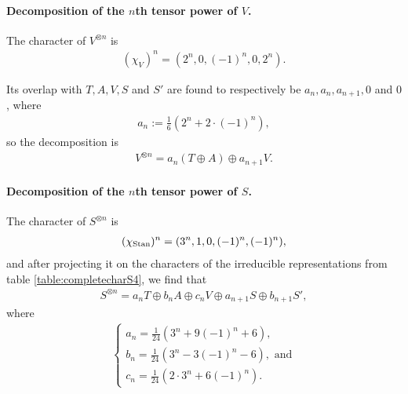 \begin{example}
	
	\paragraph{Decomposition of the $n$th tensor power of $V$.}	The character of $V^{\otimes n}$ is
	\begin{align*}
		(\chi_{V})^n = (2^n, 0, (-1)^n, 0, 2^n).
	\end{align*}
	
	Its overlap with $T, A, V, S$ and $S'$ are found to respectively be $a_n, a_n, a_{n+1}, 0$ and $0$, where 
	\begin{align*}
		a_n := \frac{1}{6}\left( 2^n + 2 \cdot (-1)^n \right),
	\end{align*}
	so the decomposition is
	\begin{align*}
		V^{\otimes n} = a_n (T \oplus A) \oplus a_{n+1} V.
	\end{align*}
	
	\paragraph{Decomposition of the $n$th tensor power of $S$.} The character of $S^{\otimes n}$ is 
	\begin{align*}
		(\chi_{\text{Stan}})^n = (3^n, 1, 0, (-1)^n, (-1)^n),
	\end{align*}
	and after projecting it on the characters of the irreducible representations from table \ref{table:completecharS4}, we find that
	\begin{align}\label{eq:nthpowerS}
		S^{\otimes n} = a_n T \oplus b_n A \oplus c_n V \oplus a_{n+1} S \oplus b_{n+1} S',
	\end{align}
	where 
	\begin{align*}
		\begin{cases}
			a_n = \frac{1}{24}(3^n + 9(-1)^n+6), \\
			b_n = \frac{1}{24}(3^n - 3(-1)^n -6), \text{ and} \\
			c_n = \frac{1}{24}(2\cdot 3^n + 6(-1)^n).
		\end{cases}
	\end{align*}
	

\end{example}
